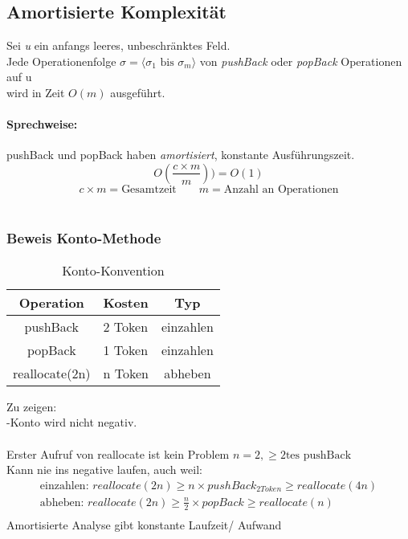 \documentclass[a4paper]{scrartcl}
\begin{document}
			\subsection{Amortisierte Komplexität}
				Sei \emph{u} ein anfangs leeres, unbeschränktes Feld.\\
				Jede Operationenfolge \emph{\( \sigma = \langle \sigma_1 \text{ bis } \sigma_m \rangle \)} von \emph{pushBack} oder \emph{popBack} Operationen auf u\\
				wird in Zeit \emph{\( O(m) \)} ausgeführt.\\
				\paragraph{Sprechweise:}
					pushBack und popBack haben \emph{amortisiert}, konstante Ausführungszeit.\\
					\[ O( \frac{c \times m}{m}) ) = O(1) \]
					\[ c \times m = \text{Gesamtzeit} \qquad m = \text{Anzahl an Operationen} \]\\
				
		\subsubsection{Beweis Konto-Methode}
			\begin{table}
				\begin{tabular}{ c | l | c}
					Operation & Kosten & Typ \\ \hline
					pushBack & 2 Token & einzahlen \\
					popBack & 1 Token & einzahlen \\
					reallocate(2n) & n Token & abheben\\
				\end{tabular}
				\caption{Konto-Konvention}
			\end{table}
		
			Zu zeigen: \\
			-Konto wird nicht negativ.\\
			\\
			Erster Aufruf von reallocate ist kein Problem \( n=2, \geq 2\text{tes pushBack} \) \\
			Kann nie ins negative laufen, auch weil:\\
			\begin{align*}
				\text{einzahlen: } reallocate(2n) \geq n \times pushBack_{2Token} \geq reallocate(4n)\\
				\text{abheben: } reallocate(2n) \geq \frac{n}{2} \times popBack \geq reallocate(n)\\
			\end{align*}
			Amortisierte Analyse gibt konstante Laufzeit/ Aufwand \\
\end{document}
